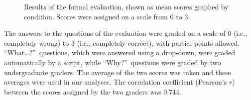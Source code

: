 \begin{figure}
\centering


	\caption[Results of the formal evaluation, shown as mean scores graphed by condition]{Results of the formal evaluation, shown as mean scores graphed by condition.  Scores were assigned on a scale from 0 to 3.}
	\label{fig:results}
\end{figure}

The answers to the questions of the evaluation were graded on a scale of 0 (i.e., completely wrong) to 3 (i.e., completely correct), with partial points allowed.  ``What\ldots?''\ questions, which were answered using a drop-down, were graded automatically by a script, while ``Why?''\ questions were graded by two undergraduate graders.  The average of the two scores was taken and these averages were used in our analyses.  The correlation coefficient (Pearson's $r$) between the scores assigned by the two graders was 0.744.

